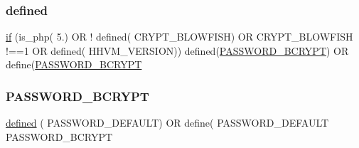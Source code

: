 \subsubsection{\texorpdfstring{defined}{defined}}
{\footnotesize\ttfamily \mbox{\hyperlink{_code_igniter_8php_a565ae1002e1468af84434f86276c519e}{if}} (is\+\_\+php( \textquotesingle{}5.\textquotesingle{}) OR ! defined( \textquotesingle{}C\+R\+Y\+P\+T\+\_\+\+B\+L\+O\+W\+F\+I\+SH\textquotesingle{}) OR C\+R\+Y\+P\+T\+\_\+\+B\+L\+O\+W\+F\+I\+SH !==1 OR defined( \textquotesingle{}H\+H\+V\+M\+\_\+\+V\+E\+R\+S\+I\+ON\textquotesingle{})) defined(\textquotesingle{}\mbox{\hyperlink{password_8php_a68891a3748e6362ed60dd2dc90d37576}{P\+A\+S\+S\+W\+O\+R\+D\+\_\+\+B\+C\+R\+Y\+PT}}\textquotesingle{}) OR define(\textquotesingle{}\mbox{\hyperlink{password_8php_a68891a3748e6362ed60dd2dc90d37576}{P\+A\+S\+S\+W\+O\+R\+D\+\_\+\+B\+C\+R\+Y\+PT}}\textquotesingle{}}

\mbox{\label{password_8php_a68891a3748e6362ed60dd2dc90d37576}} 
\subsubsection{\texorpdfstring{P\+A\+S\+S\+W\+O\+R\+D\+\_\+\+B\+C\+R\+Y\+PT}{PASSWORD\_BCRYPT}}
{\footnotesize\ttfamily \mbox{\hyperlink{password_8php_a74f41c0efe4435fb8ac2133464d3cd57}{defined}} ( \textquotesingle{}P\+A\+S\+S\+W\+O\+R\+D\+\_\+\+D\+E\+F\+A\+U\+LT\textquotesingle{}) OR define( \textquotesingle{}P\+A\+S\+S\+W\+O\+R\+D\+\_\+\+D\+E\+F\+A\+U\+LT\textquotesingle{} P\+A\+S\+S\+W\+O\+R\+D\+\_\+\+B\+C\+R\+Y\+PT}

